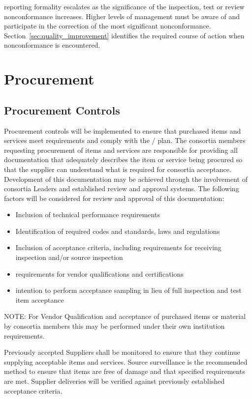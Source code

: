  reporting formality escalates as the significance of the
inspection, test or review nonconformance increases. Higher levels of
management must be aware of and participate in the correction of the
most significant nonconformance. Section~\ref{sec:quality_improvement}
identifies the required course of action when nonconformance is
encountered.

\section{Procurement}

\subsection{Procurement Controls}

Procurement controls will be implemented to ensure that purchased
items and services meet  requirements and comply with the
/  plan.  The consortia members
requesting procurement of items and services are responsible for
providing all documentation that adequately describes the item or
service being procured so that the supplier can understand what is
required for consortia acceptance. Development of this documentation
may be achieved through the involvement of consortia Leaders and
established review and approval systems. The following factors will be
considered for review and approval of this documentation:
\begin{itemize}
 \item Inclusion of technical performance requirements
 \item Identification of required codes and standards, laws and
   regulations
 \item Inclusion of acceptance criteria, including requirements for
   receiving inspection and/or source inspection
 \item {} requirements for vendor qualifications and
   certifications
 \item {} intention to perform acceptance sampling in lieu
   of full inspection and test item acceptance
\end{itemize}
NOTE: For Vendor Qualification and acceptance of purchased items or
material by consortia members this may be performed under their own
institution requirements.

Previously accepted Suppliers shall be monitored to ensure that they
continue supplying acceptable items and services. Source surveillance
is the recommended method to ensure that items are free of damage and
that specified requirements are met. Supplier deliveries will be
verified against previously established acceptance criteria.


